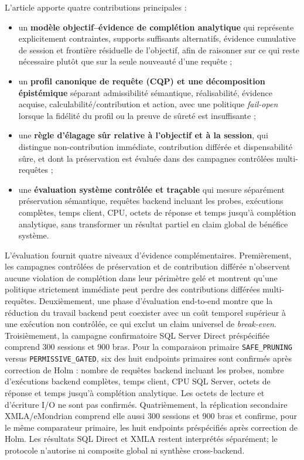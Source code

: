 \documentclass[journal]{IEEEtran}
\begin{document}
L'article apporte quatre contributions principales :
\begin{itemize}
  \item un \textbf{modèle objectif--évidence de complétion analytique} qui représente explicitement contraintes, supports suffisants alternatifs, évidence cumulative de session et frontière résiduelle de l'objectif, afin de raisonner sur ce qui reste nécessaire plutôt que sur la seule nouveauté d'une requête ;
  \item un \textbf{profil canonique de requête (CQP) et une décomposition épistémique} séparant admissibilité sémantique, réalisabilité, évidence acquise, calculabilité/contribution et action, avec une politique \emph{fail-open} lorsque la fidélité du profil ou la preuve de sûreté est insuffisante ;
  \item une \textbf{règle d'élagage sûr relative à l'objectif et à la session}, qui distingue non-contribution immédiate, contribution différée et dispensabilité sûre, et dont la préservation est évaluée dans des campagnes contrôlées multi-requêtes ;
  \item une \textbf{évaluation système contrôlée et traçable} qui mesure séparément préservation sémantique, requêtes backend incluant les probes, exécutions complètes, temps client, CPU, octets de réponse et temps jusqu'à complétion analytique, sans transformer un résultat partiel en claim global de bénéfice système.
\end{itemize}

L'évaluation fournit quatre niveaux d'évidence complémentaires. Premièrement, les campagnes contrôlées de préservation et de contribution différée n'observent aucune violation de complétion dans leur périmètre gelé et montrent qu'une politique strictement immédiate peut perdre des contributions différées multi-requêtes. Deuxièmement, une phase d'évaluation end-to-end montre que la réduction du travail backend peut coexister avec un coût temporel supérieur à une exécution non contrôlée, ce qui exclut un claim universel de \emph{break-even}. Troisièmement, la campagne confirmatoire SQL Server Direct préspécifiée comprend 300 sessions et 900 bras. Pour la comparaison primaire \texttt{SAFE\_PRUNING} versus \texttt{PERMISSIVE\_GATED}, six des huit endpoints primaires sont confirmés après correction de Holm : nombre de requêtes backend incluant les probes, nombre d'exécutions backend complètes, temps client, CPU SQL Server, octets de réponse et temps jusqu'à complétion analytique. Les octets de lecture et d'écriture I/O ne sont pas confirmés. Quatrièmement, la réplication secondaire XMLA/eMondrian comprend elle aussi 300 sessions et 900 bras et confirme, pour le même comparateur primaire, les huit endpoints préspécifiés après correction de Holm. Les résultats SQL Direct et XMLA restent interprétés séparément; le protocole n'autorise ni composite global ni synthèse cross-backend.
\end{document}
